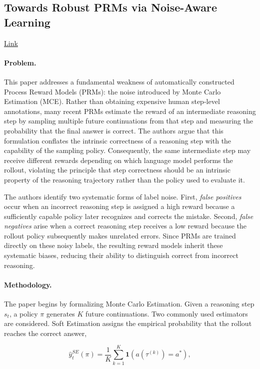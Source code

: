 \documentclass[11pt]{article}
\begin{document}
\subsection{Towards Robust PRMs via Noise-Aware Learning}

\href{https://arxiv.org/abs/2601.12748}{Link}
\paragraph{Problem.}
This paper addresses a fundamental weakness of automatically constructed Process Reward Models (PRMs): the noise introduced by Monte Carlo Estimation (MCE). Rather than obtaining expensive human step-level annotations, many recent PRMs estimate the reward of an intermediate reasoning step by sampling multiple future continuations from that step and measuring the probability that the final answer is correct. The authors argue that this formulation conflates the intrinsic correctness of a reasoning step with the capability of the sampling policy. Consequently, the same intermediate step may receive different rewards depending on which language model performs the rollout, violating the principle that step correctness should be an intrinsic property of the reasoning trajectory rather than the policy used to evaluate it.

The authors identify two systematic forms of label noise. First, \emph{false positives} occur when an incorrect reasoning step is assigned a high reward because a sufficiently capable policy later recognizes and corrects the mistake. Second, \emph{false negatives} arise when a correct reasoning step receives a low reward because the rollout policy subsequently makes unrelated errors. Since PRMs are trained directly on these noisy labels, the resulting reward models inherit these systematic biases, reducing their ability to distinguish correct from incorrect reasoning.

\paragraph{Methodology.}
The paper begins by formalizing Monte Carlo Estimation. Given a reasoning step \(s_t\), a policy \(\pi\) generates \(K\) future continuations. Two commonly used estimators are considered. Soft Estimation assigns the empirical probability that the rollout reaches the correct answer,

\[
\hat y_t^{SE}(\pi)
=
\frac{1}{K}
\sum_{k=1}^{K}
\mathbf{1}
\left(
a(\tau^{(k)})=a^*
\right),
\]
\end{document}
